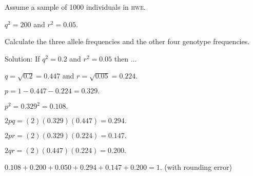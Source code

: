 \documentclass[t]{beamer}
\begin{document}
\begin{frame}[t]{Assume a sample of 1000 individuals in \textsc{hwe}.}

\hangpara $q^2 = 200$ and $r^2 = 0.05.$

\hangpara Calculate the three allele frequencies and the other four genotype frequencies.
\end{frame}



\begin{frame}[t]{Solution: If $q^2 = 0.2$ and $r^2 = 0.05$ then $\dots$}

\vspace{-0.5\baselineskip}

\hangpara $q = \sqrt{0.2} = 0.447$ and $r = \sqrt{0.05} = 0.224.$

\pause \hangpara $p = 1 - 0.447 - 0.224 = 0.329.$

\pause \hangpara $p^2 = 0.329^2 = 0.108.$

\pause \hangpara $2pq = (2)(0.329)(0.447) = 0.294.$

\pause \hangpara $2pr = (2)(0.329)(0.224) = 0.147.$

\pause \hangpara $2qr = (2)(0.447)(0.224) = 0.200.$

\pause \hangpara $0.108 + 0.200 + 0.050 + 0.294 + 0.147 + 0.200 = 1.$ (with rounding error)

\end{frame}
\end{document}
